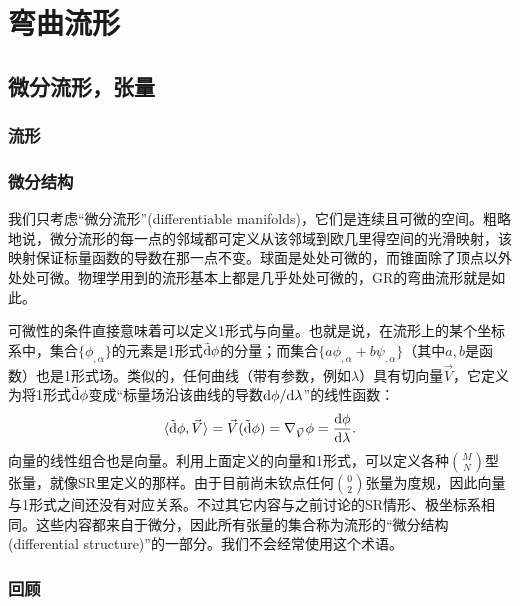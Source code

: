 \chapter{弯曲流形}
\label{chap6}

\section{微分流形，张量}
\label{sec6.1}

\subsection*{流形}

\subsection*{微分结构}
我们只考虑“微分流形”(differentiable manifolds)，它们是连续且可微的空间。粗略地说，微分流形的每一点的邻域都可定义从该邻域到欧几里得空间的光滑映射，该映射保证标量函数的导数在那一点不变。球面是处处可微的，而锥面除了顶点以外处处可微。物理学用到的流形基本上都是几乎处处可微的，GR的弯曲流形就是如此。

可微性的条件直接意味着可以定义1形式与向量。也就是说，在流形上的某个坐标系中，集合$\{ \phi_{, \alpha} \}$的元素是1形式$\tilde{\mathrm{d}} \phi$的分量；而集合$\{ a \phi_{, \alpha} + b \psi_{, \alpha} \}$（其中$a, b$是函数）也是1形式场。类似的，任何曲线（带有参数，例如$\lambda$）具有切向量$\vec{V}$，它定义为将1形式$\tilde{\mathrm{d}} \phi$变成“标量场沿该曲线的导数$\mathrm{d} \phi / \mathrm{d} \lambda$”的线性函数：
\begin{equation}
    \langle \tilde{\mathrm{d}} \phi, \vec{V} \rangle = \vec{V} (\tilde{\mathrm{d}} \phi) = \nabla_{\vec{V}} \phi = \frac{\mathrm{d} \phi}{\mathrm{d} \lambda}.
\label{equ6.1}
\end{equation}
向量的线性组合也是向量。利用上面定义的向量和1形式，可以定义各种$\binom{M}{N}$型张量，就像SR里定义的那样。由于目前尚未钦点任何$\binom{0}{2}$张量为度规，因此向量与1形式之间还没有对应关系。不过其它内容与之前讨论的SR情形、极坐标系相同。这些内容都来自于微分，因此所有张量的集合称为流形的“微分结构 (differential structure)”的一部分。我们不会经常使用这个术语。


\subsection*{回顾}

